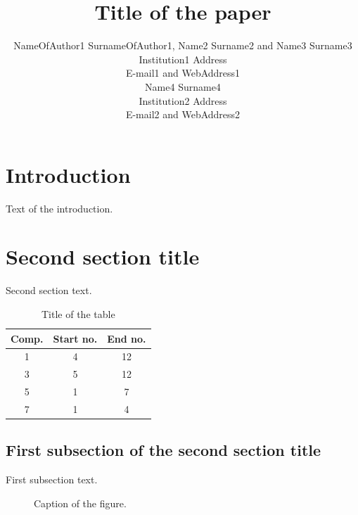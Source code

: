 \documentclass[11pt,twoside]{article}
\begin{document}
  \title{Title of the paper}
   \author{NameOfAuthor1 SurnameOfAuthor1, Name2 Surname2 and Name3 Surname3 \\
      Institution1 Address\\
      E-mail1 and WebAddress1 \\
      \AndAuthor
      Name4 Surname4 \\
      Institution2 Address\\
      E-mail2 and WebAddress2}

  \abstractSi{}

  \maketitle

\section{Introduction}
Text of the introduction.

\section{Second section title}
Second section text.

\begin{table}[h]
  \begin{center}
  \begin{tabular}{|c|c|c|} \hline
    Comp. & Start no. & End no. \\ \hline
    1 & 4 & 12 \\ \hline
    3 & 5 & 12 \\ \hline
    5 & 1 & 7  \\ \hline
    7 & 1 & 4  \\ \hline
  \end{tabular}
  \end{center}
  \caption{Title of the table}
\end{table}

\subsection{First subsection of the second section title}
First subsection text.

\begin{figure}[htb]
  \begin{center}
  \end{center}
  \caption{Caption of the figure.}
\end{figure}
\end{document}
